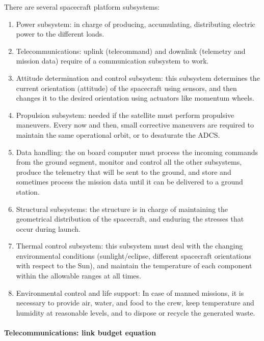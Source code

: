 There are several spacecraft platform subsystems:
%
\begin{enumerate}
\item Power subsystem: in charge of producing, accumulating, distributing 
electric power to the different loads.
\item Telecommunications: uplink (telecommand) and downlink (telemetry and 
mission data) require of a communication subsystem to work.
\item Attitude determination and control subsystem: this subsystem determines 
the current orientation (attitude) of the spacecraft using sensors, and then 
changes it to the desired orientation using actuators like momentum wheels.
\item Propulsion subsystem: needed if the satellite must perform propulsive
maneuvers. Every now and then, small corrective maneuvers are 
required to maintain the same operational orbit, or to desaturate the ADCS.
\item Data handling: the on board computer must process the incoming commands 
from the ground segment, monitor and control all the other subsystems, produce 
the telemetry that will be sent to the ground, and store and sometimes process 
the mission data until it can be delivered to a ground station.
\item Structural subsystems: the structure is in charge of maintaining the 
geometrical distribution of the spacecraft, and enduring the stresses that 
occur during launch.
\item Thermal control subsystem: this subsystem must deal with the changing 
environmental conditions (sunlight/eclipse, different spacecraft orientations 
with respect to the Sun), and maintain the temperature of each component 
within the allowable ranges at all times.
\item Environmental control and life support: In case of manned missions, it 
is necessary to provide air, water, and food to the crew, keep temperature and 
humidity at reasonable levels, and to dispose or recycle the generated waste.
\end{enumerate}
 
\paragraph{Telecommunications: link budget equation}

